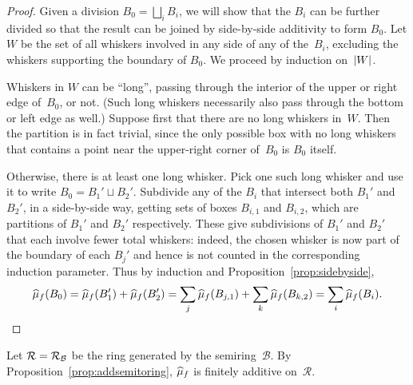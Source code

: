 \begin{proof}
  Given a division $B_0 = \bigsqcup_i B_i$, we will show that the $B_i$ can be further divided so that the result can be joined by side-by-side additivity to form $B_0$. Let $W$ be the set of all whiskers involved in any side of any of the~$B_i$, excluding the whiskers supporting the boundary of $B_0$. We proceed by induction on~$\lvert W\rvert$.

 Whiskers in $W$ can be ``long'', passing through the interior of the upper or right edge of~$B_0$, or not.  (Such long whiskers necessarily also pass through the bottom or left edge as well.)
  Suppose first that there are no long whiskers in~$W$. Then the partition is in fact trivial, since the only possible box with no long whiskers that contains a point near the upper-right corner of~$B_0$ is $B_0$ itself.

  Otherwise, there is at least one long whisker. Pick one such long whisker and use it to write $B_0 = B_1' \sqcup B_2'$. Subdivide any of the $B_i$ that intersect both $B_1'$ and $B_2'$, in a side-by-side way, getting sets of boxes $B_{i,1}$ and $B_{i,2}$, which are partitions of $B_1'$ and $B_2'$ respectively. These give subdivisions of $B_1'$ and $B_2'$ that each involve fewer total whiskers: indeed, the chosen whisker is now part of the boundary of each $B_j'$ and hence is not counted in the corresponding induction parameter. Thus by induction and Proposition~\ref{prop:sidebyside},
  \[
    \widehat{\mu}_f(B_0) = \widehat{\mu}_f(B_1') + \widehat{\mu}_f(B_2') = \sum_j \widehat{\mu}_f(B_{j,1}) +
    \sum_k \widehat{\mu}_f(B_{k,2}) = \sum_i \widehat{\mu}_f(B_i). \qedhere
  \]
\end{proof}

 \begin{figure}
\end{figure}

Let $\mathcal{R} = \mathcal{R}_{\mathcal{B}}$ be the ring generated by the
semiring~$\mathcal{B}$. By
Proposition~\ref{prop:addsemitoring}, $\widehat{\mu}_f$ is finitely additive
on~$\mathcal{R}$.

